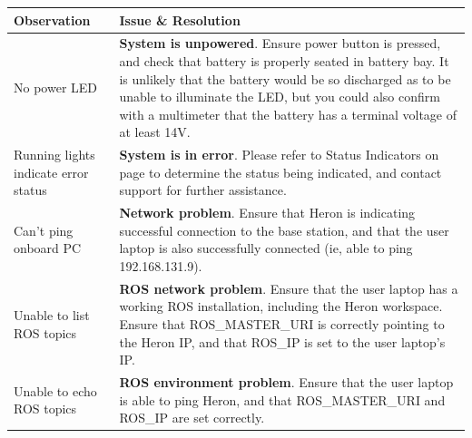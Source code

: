 \documentclass[]{clearpath-latex/clearpath-manual}
\begin{document}
\bgroup
\def\arraystretch{1.5}%
\begin{table}[h]
\centering
\label{troublshooting}
\begin{tabular}{p{} p{}}

\rowcolor{lightgrey}
{\bf Observation}                    & {\bf Issue \& Resolution}                                                                                                                                                                                                                                                                                          \\ \hline
No power LED                         & \textbf{System is unpowered}. Ensure power button is pressed, and check that battery is properly seated in battery bay. It is unlikely that the battery would be so discharged as to be unable to illuminate the LED, but you could also confirm with a multimeter that the battery has a terminal voltage of at least 14V. \\ \hline
Running lights indicate error status & \textbf{System is in error}. Please refer to Status Indicators on page \pageref{statusindicators} to determine the status being indicated, and contact support for further assistance.                                                                                                                                                               \\ \hline
Can’t ping onboard PC                & \textbf{Network problem}. Ensure that Heron is indicating successful connection to the base station, and that the user laptop is also successfully connected (ie, able to ping 192.168.131.9).                                                                                                                           \\ \hline
Unable to list ROS topics            & \textbf{ROS network problem}. Ensure that the user laptop has a working ROS installation, including the Heron workspace. Ensure that ROS\_MASTER\_URI is correctly pointing to the Heron IP, and that ROS\_IP is set to the user laptop’s IP.                                                                     \\ \hline
Unable to echo ROS topics            & \textbf{ROS environment problem}. Ensure that the user laptop is able to ping Heron, and that ROS\_MASTER\_URI and ROS\_IP are set correctly.                                                                                                                                                                          \\ \hline
\end{tabular}
\end{table}
\egroup
\end{document}
